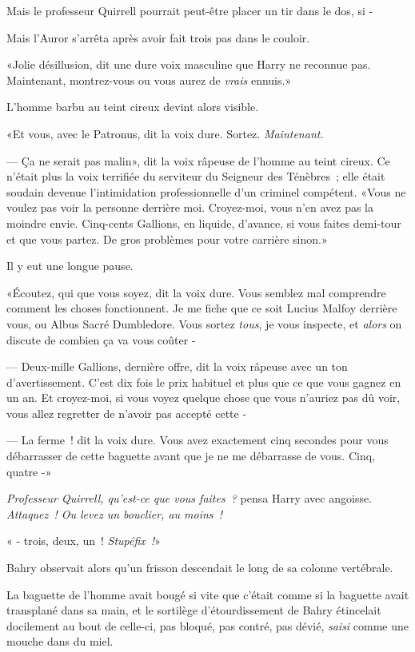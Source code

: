 Mais le professeur Quirrell pourrait peut-être placer un tir dans le dos, si -

Mais l'Auror s'arrêta après avoir fait trois pas dans le couloir.

«Jolie désillusion, dit une dure voix masculine que Harry ne reconnue pas. Maintenant, montrez-vous ou vous aurez de \emph{vrais} ennuis.»

L'homme barbu au teint cireux devint alors visible.

«Et vous, avec le Patronus, dit la voix dure. Sortez. \emph{Maintenant.}

--- Ça ne serait pas malin», dit la voix râpeuse de l'homme au teint cireux. Ce n'était plus la voix terrifiée du serviteur du Seigneur des Ténèbres~; elle était soudain devenue l'intimidation professionnelle d'un criminel compétent. «Vous ne voulez pas voir la personne derrière moi. Croyez-moi, vous n'en avez pas la moindre envie. Cinq-cents Gallions, en liquide, d'avance, si vous faites demi-tour et que vous partez. De gros problèmes pour votre carrière sinon.»

Il y eut une longue pause.

«Écoutez, qui que vous soyez, dit la voix dure. Vous semblez mal comprendre comment les choses fonctionnent. Je me fiche que ce soit Lucius Malfoy derrière vous, ou Albus Sacré Dumbledore. Vous sortez \emph{tous}, je vous inspecte, et \emph{alors} on discute de combien ça va vous coûter -

--- Deux-mille Gallions, dernière offre, dit la voix râpeuse avec un ton d'avertissement. C'est dix fois le prix habituel et plus que ce que vous gagnez en un an. Et croyez-moi, si vous voyez quelque chose que vous n'auriez pas dû voir, vous allez regretter de n'avoir pas accepté cette -

--- La ferme~! dit la voix dure. Vous avez exactement cinq secondes pour vous débarrasser de cette baguette avant que je ne me débarrasse de vous. Cinq, quatre -»

\emph{Professeur Quirrell, qu'est-ce que vous faites~?} pensa Harry avec angoisse. \emph{Attaquez~! Ou levez un bouclier, au moins~!}

« - trois, deux, un~! \emph{Stupéfix~!}»

\later

Bahry observait alors qu'un frisson descendait le long de sa colonne vertébrale.

La baguette de l'homme avait bougé si vite que c'était comme si la baguette avait transplané dans sa main, et le sortilège d'étourdissement de Bahry étincelait docilement au bout de celle-ci, pas bloqué, pas contré, pas dévié, \emph{saisi} comme une mouche dans du miel.

